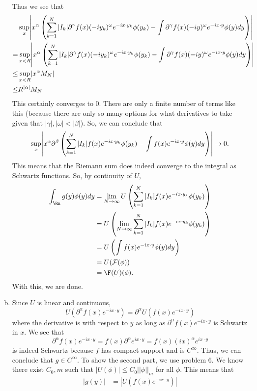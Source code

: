 \documentclass{article}
\renewcommand{\d}{\partial}
\begin{document}
\begin{enumerate}[(a)]
    Thus we see that 
    \begin{align*}
        &\sup_{x} \abs{x^\alpha \del{\sum_{k=1}^N |I_k|\d^\gamma f(x)(-iy_k)^\omega e^{-ix \cdot y_k} \phi(y_k) - \int \d^\gamma f(x) (-iy)^\omega e^{-ix \cdot y}\phi(y) dy}} \\
        =&\sup_{x<R} \abs{x^\alpha \del{\sum_{k=1}^N |I_k|\d^\gamma f(x)(-iy_k)^\omega e^{-ix \cdot y_k} \phi(y_k) - \int \d^\gamma f(x) (-iy)^\omega e^{-ix \cdot y}\phi(y) dy}} \\
        \le & \sup_{x < R} \abs{x^\alpha M_N}\\
        \le & R^{|\alpha|}M_N
    \end{align*}
    This certainly converges to 0. There are only a finite number of terms like this (because there are only so many options for what derivatives to take given that $|\gamma|, |\omega| < |\beta|$). So, we can conclude that 
    \[\sup_x\abs{x^\alpha \d^\beta \del{\sum^N_{k=1} |I_k|f(x)e^{-i x \cdot y_k}\phi(y_k) - \int f(x)e^{-ix \cdot y} \phi(y)dy}} \to 0.\]
    This means that the Riemann sum does indeed converge to the integral as Schwartz functions. So, by continuity of $U$, 
    \begin{align*}
        \int_\Rn g(y)\phi(y)dy &=  \lim_{N \to \infty}  U\del{\sum^N_{k=1} |I_k| f(x)e^{-i x \cdot y_k}\phi(y_k)} \\
        &= U\del{\lim_{N \to \infty} \sum^N_{k=1} |I_k| f(x)e^{-i x \cdot y_k}\phi(y_k)} \\
        &= U\del{\int f(x)e^{-i x \cdot y}\phi(y) dy} \\
        &= U(\cal{F}(\phi)) \\
        &=\F(U)(\phi).
    \end{align*}
    With this, we are done. 
    \item Since $U$ is linear and continuous, 
    \[U(\d^\alpha f(x)e^{-ix \cdot y}) = \d^\alpha U(f(x)e^{-ix \cdot y})\]
    where the derivative is with respect to $y$ as long as $\d^\alpha f(x)e^{-ix \cdot y}$ is Schwartz in $x$. 
    \hop 
    We see that 
    \[\d^\alpha f(x)e^{-ix \cdot y}= f(x)\d^\alpha e^{ix \cdot y} = f(x)(ix)^\alpha e^{ix \cdot y}\]
    is indeed Schwartz because $f$ has compact support and is $C^\infty$. Thus, we can conclude that $g \in C^\infty$. 
    \hop 
    To show the second part, we use problem 6. We know there exist $C_0, m$ such that $|U(\phi)| \le C_0||\phi||_{m}$ for all $\phi$. This means that 
    \begin{align*}
        |g(y)| &= |U(f(x)e^{-ix \cdot y})| \\

\end{align*}
\end{enumerate}
\end{document}
